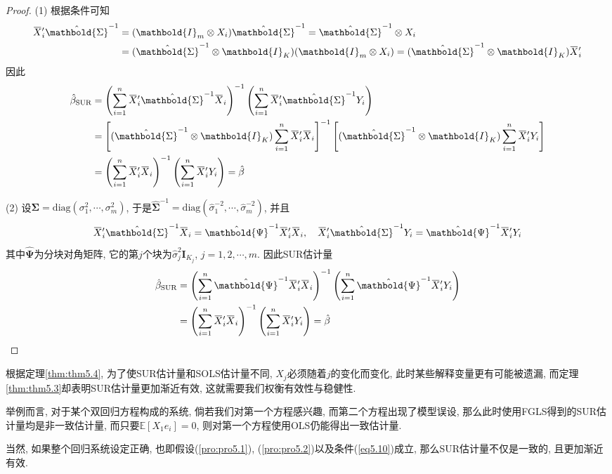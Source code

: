 \documentclass[cn, 12pt, math=mtpro2, bibstyle=apa, blue, twocol]{elegantbook}
\newcommand{\E}{\mathbb{E}}
\newcommand{\hb}{\hat{\beta}}
\newcommand{\OX}{\overbar{X}}
\newcommand{\BS}{\mathbold{\Sigma}}
\newcommand{\overbar}[1]{\mkern 1.5mu\overline{\mkern-1.5mu#1\mkern-1.5mu}\mkern 1.5mu}
\begin{document}
\begin{proof}
  (1) 根据条件可知
  \begin{align*}
  \OX_i'\hat{\BS}^{-1}&=(\mathbold{I}_m\otimes X_i)\hat{\BS}^{-1}=\hat{\BS}^{-1}\otimes X_i \\
  &=(\hat{\BS}^{-1}\otimes\mathbold{I}_K)(\mathbold{I}_m\otimes X_i)=(\hat{\BS}^{-1}\otimes\mathbold{I}_K)\OX_i'
  \end{align*}
  因此
  \begin{align*}
  \hb_{\text{SUR}}&=\left(\sum_{i=1}^{n}\overbar{X}_i'\hat{\mathbold{\Sigma}}^{-1}\overbar{X}_i\right)^{-1}\left(\sum_{i=1}^{n}\overbar{X}_i'\hat{\mathbold{\Sigma}}^{-1}Y_i\right) \\
  &=\left[(\hat{\BS}^{-1}\otimes\mathbold{I}_K)\sum_{i=1}^{n}\OX_i'\OX_i\right]^{-1}\left[(\hat{\BS}^{-1}\otimes\mathbold{I}_K)\sum_{i=1}^{n}\OX_i'Y_i\right] \\
  &=\left(\sum_{i=1}^{n}\OX_i'\OX_i\right)^{-1}\left(\sum_{i=1}^{n}\OX_i'Y_i\right)=\hb
  \end{align*}

  (2) 设$\BS=\text{diag}(\sigma^2_1,\cdots,\sigma_m^2)$, 于是$\hat{\BS}^{-1}=\text{diag}(\hat{\sigma}_1^{-2},\cdots,\hat{\sigma}_m^{-2})$, 并且
  $$\OX_i'\hat{\BS}^{-1}\OX_i=\hat{\mathbold{\Psi}}^{-1}\OX_i'\OX_i,\quad \OX_i'\hat{\BS}^{-1}Y_i=\hat{\mathbold{\Psi}}^{-1}\OX_i'Y_i$$
  其中$\hat{\mathbold{\Psi}}$为分块对角矩阵, 它的第$j$个块为$\hat{\sigma}^2_j\mathbold{I}_{K_j}$, $j=1,2,\cdots,m$. 因此SUR估计量
  \begin{align*}
  \hb_{\text{SUR}}&=\left(\sum_{i=1}^{n}\hat{\mathbold{\Psi}}^{-1}\OX_i'\OX_i\right)^{-1}\left(\sum_{i=1}^{n}\hat{\mathbold{\Psi}}^{-1}\OX_i'Y_i\right) \\
  &=\left(\sum_{i=1}^{n}\OX_i'\OX_i\right)^{-1}\left(\sum_{i=1}^{n}\OX_i'Y_i\right)=\hb
  \end{align*}
\end{proof}
根据定理\ref{thm:thm5.4}, 为了使SUR估计量和SOLS估计量不同, $X_j$必须随着$j$的变化而变化, 此时某些解释变量更有可能被遗漏, 而定理\ref{thm:thm5.3}却表明SUR估计量更加渐近有效, 这就需要我们权衡有效性与稳健性.

举例而言, 对于某个双回归方程构成的系统, 倘若我们对第一个方程感兴趣, 而第二个方程出现了模型误设, 那么此时使用FGLS得到的SUR估计量均是非一致估计量, 而只要$\E[X_1e_i]=0$, 则对第一个方程使用OLS仍能得出一致估计量.

当然, 如果整个回归系统设定正确, 也即假设(\ref{pro:pro5.1}), (\ref{pro:pro5.2})以及条件(\ref{eq5.10})成立, 那么SUR估计量不仅是一致的, 且更加渐近有效.
\end{document}
